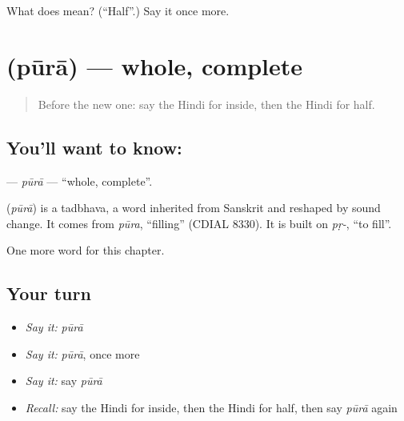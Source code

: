 \begin{tcolorbox}[breakable,colback=teal!4,colframe=teal!35!black,title={Before you move on}]
What does  mean? (\textquotedblleft{}Half\textquotedblright{}.) Say it once more.
\end{tcolorbox}
\section[\texorpdfstring{\hi{पूरा} (pūrā)}{पूरा (pūrā)}]{ (pūrā) — whole, complete}

\label{lesson:HI-C236-pura}



\begin{quote}
Before the new one: say the Hindi for inside, then the Hindi for half.
\end{quote}

\subsection*{You'll want to know: }
\textbf{} — \emph{pūrā} — \textquotedblleft{}whole, complete\textquotedblright{}.

\begin{cousinweb}
\textbf{} (\emph{pūrā}) is a tadbhava, a word inherited from Sanskrit and reshaped by sound change. It comes from \emph{pūra}, \textquotedblleft{}filling\textquotedblright{} (CDIAL 8330). It is built on \emph{pṛ-}, \textquotedblleft{}to fill\textquotedblright{}.
\end{cousinweb}

\begin{grammarlens}[title={What you've built}]
One more word for this chapter.
\end{grammarlens}

\subsection*{Your turn}
\begin{itemize}
\raggedright
  \item \emph{Say it:} \emph{pūrā}
  \item \emph{Say it:} \emph{pūrā}, once more
  \item \emph{Say it:} say \emph{pūrā}
  \item \emph{Recall:} say the Hindi for inside, then the Hindi for half, then say \emph{pūrā} again
\end{itemize}

